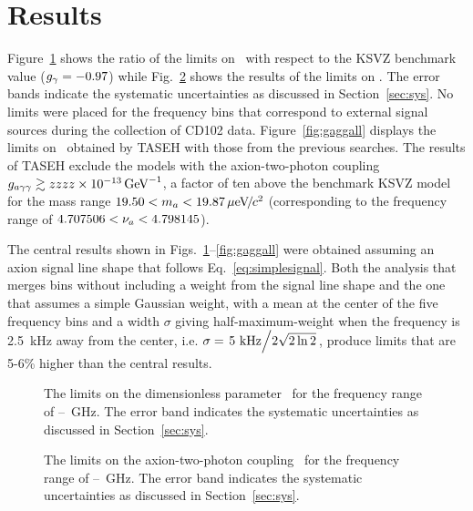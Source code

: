 \section{Results} \label{sec:results}
Figure~\ref{fig:glimit} shows the ratio of the limits on \ggamma\ with respect 
to the KSVZ benchmark value ($g_{\gamma}=-0.97$) while Fig.~\ref{fig:gagglimit} 
shows the results of the limits on \gagg. 
The error bands indicate the systematic uncertainties as discussed in 
Section~\ref{sec:sys}. No limits were placed for the frequency bins 
that correspond to external signal sources during the collection of CD102 
data. Figure~\ref{fig:gaggall} displays 
the limits on \gagg\ obtained by TASEH with those from the previous searches. 
The results of TASEH exclude the models with the axion-two-photon
coupling $g_{a\gamma\gamma}\gtrsim zzzz\times 10^{-13}\,\text{Ge\hspace{-.08em}V}^{-1}$, a factor of ten above the benchmark
KSVZ model for the mass range $19.50 < m_a < 19.87 \,\mu\text{e\hspace{-.08em}V\hspace{-0.16em}/\hspace{-0.08em}}c^2$ (corresponding to 
the frequency range of $4.707506 < \nu_a < 4.798145$). 

The central results shown in Figs.~\ref{fig:glimit}--\ref{fig:gaggall} were 
obtained assuming an axion signal line shape that follows 
Eq.~\ref{eq:simplesignal}. Both the analysis that merges bins without including
 a weight from the signal line shape and the one 
that assumes a simple Gaussian weight, with a mean at the center of the five 
frequency bins and a width $\sigma$ 
giving half-maximum-weight when the frequency 
is 2.5~kHz away from the center, i.e. 
$\sigma=\left.5~\text{kHz}\middle/2\sqrt{2\ln2}\right.$, produce limits that 
are 5-6\% higher than the central results. 

\begin{figure} [htbp]
  \centering
  \caption{The limits on the dimensionless parameter \ggamma\ for the 
frequency range of \flo--\fhi~GHz. The error band indicates the systematic 
  uncertainties as discussed in Section~\ref{sec:sys}. }
  \label{fig:glimit}
\end{figure}

\begin{figure} [htbp]
  \centering
  \caption{The limits on the axion-two-photon coupling \gagg\ for the frequency 
range of \flo--\fhi~GHz. The error band indicates the systematic 
  uncertainties as discussed in Section~\ref{sec:sys}. }
  \label{fig:gagglimit}
\end{figure}

